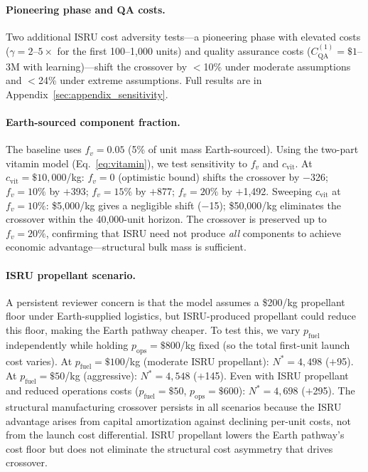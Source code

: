 \documentclass[preprint,12pt]{elsarticle}
\begin{document}
\paragraph{Pioneering phase and QA costs.} Two additional ISRU cost adversity tests---a pioneering phase with elevated costs ($\gamma = 2$--$5\times$ for the first 100--1{,}000 units) and quality assurance costs ($C_{\mathrm{QA}}^{(1)} = \$1$--$3$M with learning)---shift the crossover by $<$10\% under moderate assumptions and $<$24\% under extreme assumptions. Full results are in Appendix~\ref{sec:appendix_sensitivity}.

\paragraph{Earth-sourced component fraction.} The baseline uses $f_v = 0.05$ (5\% of unit mass Earth-sourced). Using the two-part vitamin model (Eq.~\ref{eq:vitamin}), we test sensitivity to $f_v$ and $c_{\mathrm{vit}}$. At $c_{\mathrm{vit}} = \$10{,}000$/kg: $f_v = 0$ (optimistic bound) shifts the crossover by $-$326; $f_v = 10\%$ by $+$393; $f_v = 15\%$ by $+$877; $f_v = 20\%$ by $+$1{,}492. Sweeping $c_{\mathrm{vit}}$ at $f_v = 10\%$: \$5{,}000/kg gives a negligible shift ($-$15); \$50{,}000/kg eliminates the crossover within the 40{,}000-unit horizon. The crossover is preserved up to $f_v = 20\%$, confirming that ISRU need not produce \emph{all} components to achieve economic advantage---structural bulk mass is sufficient.

\paragraph{ISRU propellant scenario.} A persistent reviewer concern is that the model assumes a \$200/kg propellant floor under Earth-supplied logistics, but ISRU-produced propellant could reduce this floor, making the Earth pathway cheaper. To test this, we vary $p_{\mathrm{fuel}}$ independently while holding $p_{\mathrm{ops}} = \$800$/kg fixed (so the total first-unit launch cost varies). At $p_{\mathrm{fuel}} = \$100$/kg (moderate ISRU propellant): $N^* = 4{,}498$ ($+$95). At $p_{\mathrm{fuel}} = \$50$/kg (aggressive): $N^* = 4{,}548$ ($+$145). Even with ISRU propellant and reduced operations costs ($p_{\mathrm{fuel}} = \$50$, $p_{\mathrm{ops}} = \$600$): $N^* = 4{,}698$ ($+$295). The structural manufacturing crossover persists in all scenarios because the ISRU advantage arises from capital amortization against declining per-unit costs, not from the launch cost differential. ISRU propellant lowers the Earth pathway's cost floor but does not eliminate the structural cost asymmetry that drives crossover.
\end{document}
